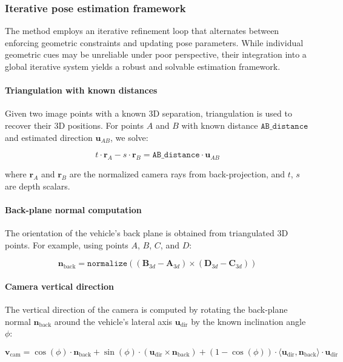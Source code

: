 \subsubsection{Iterative pose estimation framework}
The method employs an iterative refinement loop that alternates between enforcing geometric constraints and updating pose parameters. While individual geometric cues may be unreliable under poor perspective, their integration into a global iterative system yields a robust and solvable estimation framework.

\paragraph{Triangulation with known distances}
Given two image points with a known 3D separation, triangulation is used to recover their 3D positions. For points $A$ and $B$ with known distance $\texttt{AB\_distance}$ and estimated direction $\mathbf{u}_{AB}$, we solve:

\begin{equation}
    t \cdot \mathbf{r}_A - s \cdot \mathbf{r}_B = \texttt{AB\_distance} \cdot \mathbf{u}_{AB}
\end{equation}

where $\mathbf{r}_A$ and $\mathbf{r}_B$ are the normalized camera rays from back-projection, and $t$, $s$ are depth scalars.

\paragraph{Back-plane normal computation}
The orientation of the vehicle’s back plane is obtained from triangulated 3D points. For example, using points $A$, $B$, $C$, and $D$:

\begin{equation}
    \mathbf{n}_{\text{back}} = \texttt{normalize} \left( ( \mathbf{B}_{3d} - \mathbf{A}_{3d} ) \times ( \mathbf{D}_{3d} - \mathbf{C}_{3d} ) \right)
\end{equation}

\paragraph{Camera vertical direction}
The vertical direction of the camera is computed by rotating the back-plane normal $\mathbf{n}_{\text{back}}$ around the vehicle’s lateral axis $\mathbf{u}_{\text{dir}}$ by the known inclination angle $\phi$:

\begin{equation}
    \mathbf{v}_{\text{cam}} = \cos(\phi) \cdot \mathbf{n}_{\text{back}} + 
    \sin(\phi) \cdot ( \mathbf{u}_{\text{dir}} \times \mathbf{n}_{\text{back}} ) + 
    (1 - \cos(\phi)) \cdot \langle \mathbf{u}_{\text{dir}}, \mathbf{n}_{\text{back}} \rangle \cdot \mathbf{u}_{\text{dir}}
\end{equation}

